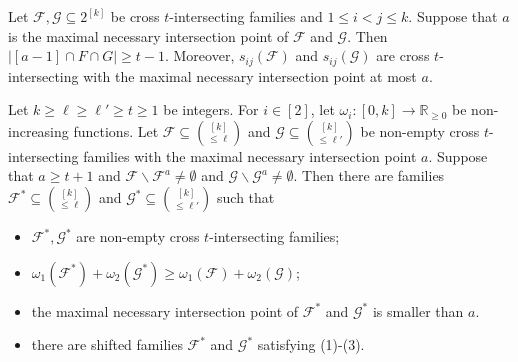 \documentclass[10pt,a4paper]{amsart}
\begin{document}
 \begin{lemma}\label{34}
      Let $\mathcal{F}, \mathcal{G} \subseteq 2^{[k]}$ be cross $t$-intersecting families and $1\le i< j\le k$. Suppose that $a$ is the maximal necessary intersection point of $\mathcal{F}$ and $ \mathcal{G}$. Then 
      $
       \left|[a-1] \cap F\cap G\right|\ge t-1.
      $
 Moreover, $s_{ij}(\mathcal{F})$ and $ s_{ij}(\mathcal{G})$ are  cross $t$-intersecting with the maximal necessary intersection point at most $a$. 
 \end{lemma}

\begin{lemma}\label{35}
     Let $k \geq \ell \geq \ell' \geq t\geq 1$  be integers. For $i \in[2]$, let $\omega_i:[0,k] \rightarrow \mathbb{R}_{\geq 0}$ be non-increasing functions.  Let $\mathcal{F}\subseteq\binom{[k]}{\leq \ell}$ and $\mathcal{G} \subseteq\binom{[k]}{\leq \ell'}$ be non-empty cross $t$-intersecting families with the maximal necessary intersection point $a$. Suppose that $a \geq t+1$ and $\mathcal{F} \backslash \mathcal{F}^a \neq \emptyset$ and $\mathcal{G} \backslash \mathcal{G}^a \neq \emptyset$. Then there are families $\mathcal{F}^*\subseteq\binom{[k]}{\leq \ell}$ and $\mathcal{G}^* \subseteq\binom{[k]}{\leq \ell'}$  such that
     \begin{itemize}
         \item [(1)] $\mathcal{F}^*, \mathcal{G}^*$ are non-empty cross $t$-intersecting families;
        \item[(2)]  $\omega_1(\mathcal{F}^*)+\omega_2(\mathcal{G}^*)\ge \omega_1(\mathcal{F})+\omega_2(\mathcal{G})$;
        \item[(3)] the maximal necessary intersection point of $\mathcal{F}^*$ and $\mathcal{G}^*$ is smaller than $a$.
         \item[(4)] there are shifted families $\mathcal{F}^*$ and $\mathcal{G}^*$ satisfying (1)-(3).
     \end{itemize}
\end{lemma}
\end{document}
